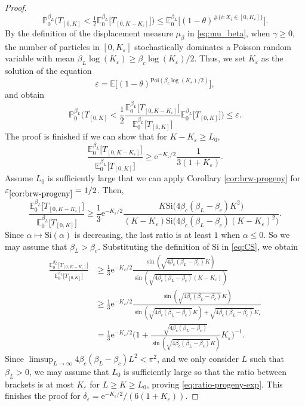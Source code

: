 \documentclass[a4paper, a4wide, 10pt, reqno]{amsart}
\theoremstyle{plain}
\theoremstyle{definition}
\numberwithin{equation}{section}
\newcommand{\E}{\mathbb E}
\newcommand{\Prob}{\mathbb{P}}
\newcommand\eps{\varepsilon}
\newcommand{\re}{{\mathrm e}}
\newcommand{\Si}{{\mathrm{Si}}}
\begin{document}
\begin{proof}
    \[
    \Prob_0^{\beta_L}\Big(T_{[0, K]} < \tfrac{1}{2}\E^{\beta_L}_{0}\big[T_{[0, K-K_\varepsilon]}\big]\Big) \le \E_0^{\beta_L}\Big[(1-\theta)^{\#\{i: X_i\in[0, K_\varepsilon]\}}\Big]. 
    \]
    By the definition of the displacement measure $\mu_\beta$ in \eqref{eq:mu_beta}, when $\gamma\ge 0$, the number of particles in $[0, K_\varepsilon]$ stochastically dominates a Poisson random variable with mean $\beta_L\log(K_\varepsilon)\ge \beta_c\log(K_\varepsilon)/2$. Thus, we set $K_\varepsilon$ as the solution of the equation 
    \[
    \varepsilon = \E\Big[(1-\theta)^{\mathrm{Poi}(\beta_c\log(K_\varepsilon)/2)}\Big],
    \]
    and obtain 
    \[
     \Prob_0^{\beta_L}\bigg(T_{[0, K]} < \frac{1}{2}\frac{\E^{\beta_L}_{0}\big[T_{[0, K-K_\varepsilon]}\big]}{\E^{\beta_L}_{0}\big[T_{[0, K]}\big]}\E^{\beta_L}_{0}\big[T_{[0, K]}\big]\bigg) \le \varepsilon.
    \]
    The proof is finished if we can show that for $K-K_\varepsilon\ge L_0$, 
    \begin{equation}\label{eq:ratio-progeny-exp}
    \frac{\E^{\beta_L}_{0}\big[T_{[0, K-K_\varepsilon]}\big]}{\E^{\beta_L}_{0}\big[T_{[0, K]}\big]} \ge \re^{-K_\varepsilon/2}\frac{1}{3(1+K_\varepsilon)}. 
    \end{equation}
    Assume $L_0$ is sufficiently large that we can apply Corollary \ref{cor:brw-progeny} for $\eps_{\ref{cor:brw-progeny}}=1/2$. Then, 
    \[
    \frac{\E^{\beta_L}_{0}\big[T_{[0, K-K_\varepsilon]}\big]}{\E^{\beta_L}_{0}\big[T_{[0, K]}\big]} \ge \frac{1}{3}\re^{-K_\varepsilon/2} \frac{K\Si\big(4\beta_c(\beta_L-\beta_c)K^2\big)}{(K-K_\varepsilon)\Si\big(4\beta_c(\beta_L-\beta_c)(K-K_\varepsilon)^2\big)}.
    \]
    Since $\alpha\mapsto\Si(\alpha)$ is decreasing, the last ratio is at least $1$ when $\alpha\le 0$. So we may assume that $\beta_L>\beta_c$. Substituting the definition of $\Si$ in \eqref{eq:CS}, we obtain 
    \[
    \begin{aligned}
    \frac{\E^{\beta_L}_{0}\big[T_{[0, K-K_\varepsilon]}\big]}{\E^{\beta_L}_{0}\big[T_{[0, K]}\big]} &\ge \frac{1}{3}\re^{-K_\varepsilon/2}\frac{\sin(\sqrt{4\beta_c(\beta_L-\beta_c)}K)}{\sin(\sqrt{4\beta_c(\beta_L-\beta_c)}(K-K_\varepsilon))}\\ 
    &\ge \frac{1}{3}\re^{-K_\varepsilon/2}\frac{\sin(\sqrt{4\beta_c(\beta_L-\beta_c)}K) }{\sin(\sqrt{4\beta_c(\beta_L-\beta_c)}K) + \sqrt{4\beta_c(\beta_L-\beta_c)}K_\varepsilon} \\
    &= \frac{1}{3}\re^{-K_\varepsilon/2}\bigg(1+\frac{\sqrt{4\beta_c(\beta_L-\beta_c)}}{\sin(\sqrt{4\beta_c(\beta_L-\beta_c)}K)}K_\varepsilon\bigg)^{-1}.
    \end{aligned}
    \]
    Since $\limsup_{L\to\infty}4\beta_c(\beta_L-\beta_c)L^2<\pi^2$, and we only consider $L$ such that $\beta_L>0$, we may assume that $L_0$ is sufficiently large so that the ratio between brackets is at most $K_\varepsilon$ for $L\ge K\ge L_0$, proving \eqref{eq:ratio-progeny-exp}. This finishes the proof for $\delta_\varepsilon=\re^{-K_\varepsilon/2}/(6(1+K_\varepsilon))$.
\end{proof}
\end{document}
